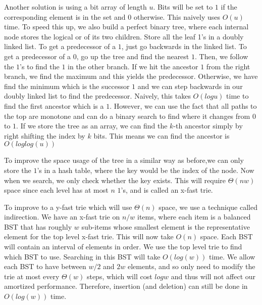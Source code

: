 \documentclass[11pt]{article}
\begin{document}
Another solution is using a bit array of length $u$. Bits will be set to $1$ if the corresponding element is in the set and $0$ otherwise. This naively uses $O(u)$ time. To speed this up, we also build a perfect binary tree, where each internal node stores the logical or of its two children. Store all the leaf 1's in a doubly linked list. To get a predecessor of a $1$, just go backwards in the linked list. To get a predecessor of a $0$, go up the tree and find the nearest $1$. Then, we follow the $1$'s to find the $1$ in the other branch. If we hit the ancestor $1$ from the right branch, we find the maximum and this yields the predecessor. Otherwise, we have find the minimum which is the successor $1$ and we can step backwards in our doubly linked list to find the predecessor. Naively, this takes $O(log{u})$ time to find the first ancestor which is a $1$. However, we can use the fact that all paths to the top are monotone and can do a binary search to find where it changes from $0$ to $1$. If we store the tree as an array, we can find the $k$-th ancestor simply by right shifting the index by $k$ bits. This means we can find the ancestor is $O(log{log(u)})$

To improve the space usage of the tree in a similar way as before,we can only store the $1$'s in a hash table, where the key would be the index of the node. Now when we search, we only check whether the key exists. This will require $\Theta(nw)$ space since each level has at most $n$ $1$'s, and is called an x-fast trie. 

To improve to a y-fast trie which will use $\Theta(n)$ space, we use a technique called indirection. We have an x-fast trie on $n/w$ items, where each item is a balanced BST that has roughly $w$ sub-items whose smallest element is the representative element for the top level x-fast trie. This will now take $O(n)$ space. Each BST will contain an interval of elements in order. We use the top level trie to find which BST to use. Searching in this BST will take $O(log(w))$ time. We allow each BST to have between $w/2$ and $2w$ elements, and so only need to modify the trie at most every $\Theta(w)$ steps, which will cost $log{w}$ and thus will not affect our amortized performance. Therefore, insertion (and deletion) can still be done in $O(log(w))$ time. 


\end{document}
